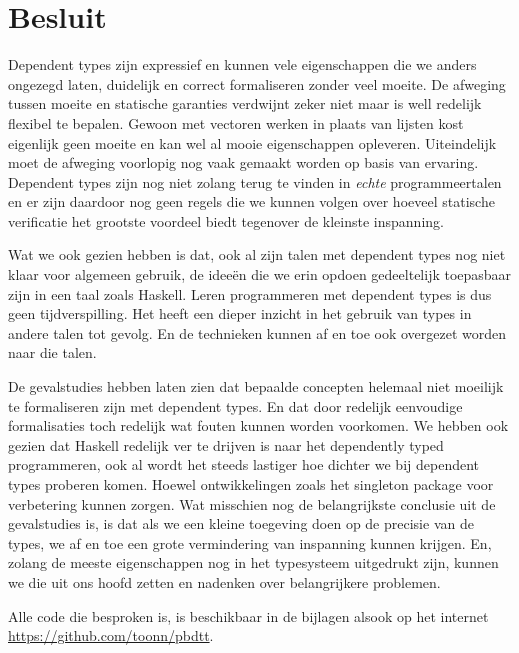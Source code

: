 \chapter{Besluit}
\label{besluit}

Dependent types zijn expressief en kunnen vele eigenschappen die we anders
ongezegd laten, duidelijk en correct formaliseren zonder veel moeite. De
afweging tussen moeite en statische garanties verdwijnt zeker niet maar is well
redelijk flexibel te bepalen. Gewoon met vectoren werken in plaats van lijsten
kost eigenlijk geen moeite en kan wel al mooie eigenschappen opleveren.
Uiteindelijk moet de afweging voorlopig nog vaak gemaakt worden op basis van
ervaring. Dependent types zijn nog niet zolang terug te vinden in \emph{echte}
programmeertalen en er zijn daardoor nog geen regels die we kunnen volgen over
hoeveel statische verificatie het grootste voordeel biedt tegenover de kleinste
inspanning. 

Wat we ook gezien hebben is dat, ook al zijn talen met dependent types nog niet
klaar voor algemeen gebruik, de ideeën die we erin opdoen gedeeltelijk
toepasbaar zijn in een taal zoals Haskell. Leren programmeren met dependent
types is dus geen tijdverspilling. Het heeft een dieper inzicht in het gebruik
van types in andere talen tot gevolg. En de technieken kunnen af en toe ook
overgezet worden naar die talen. 

De gevalstudies hebben laten zien dat bepaalde concepten helemaal niet moeilijk
te formaliseren zijn met dependent types. En dat door redelijk eenvoudige
formalisaties toch redelijk wat fouten kunnen worden voorkomen. We hebben ook
gezien dat Haskell redelijk ver te drijven is naar het dependently typed
programmeren, ook al wordt het steeds lastiger hoe dichter we bij dependent
types proberen komen. Hoewel ontwikkelingen zoals het singleton package voor
verbetering kunnen zorgen. Wat misschien nog de belangrijkste conclusie uit de
gevalstudies is, is dat als we een kleine toegeving doen op de precisie van de
types, we af en toe een grote vermindering van inspanning kunnen krijgen. En,
zolang de meeste eigenschappen nog in het typesysteem uitgedrukt zijn, kunnen
we die uit ons hoofd zetten en nadenken over belangrijkere problemen.

Alle code die besproken is, is beschikbaar in de bijlagen alsook op het
internet \url{https://github.com/toonn/pbdtt}.
